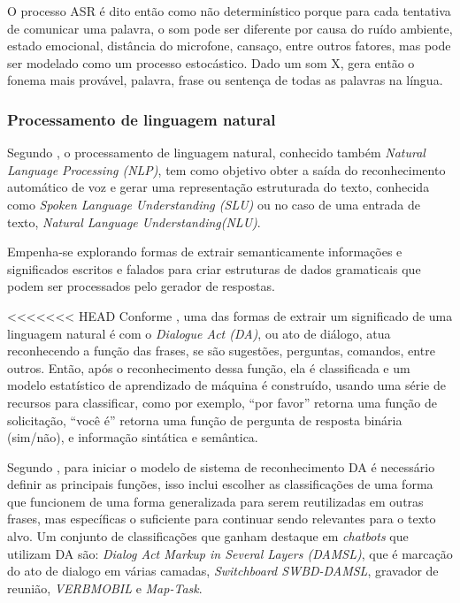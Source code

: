\documentclass[
	12pt,				%
	oneside,
	a4paper,			%
	english,			%
	french,				%
	spanish,			%
	brazil				%
	]{abntex2}
\begin{document}
O processo ASR é dito então como não determinístico porque para cada tentativa de comunicar uma palavra, o som pode ser diferente por causa do ruído ambiente, estado emocional, distância do microfone, cansaço, entre outros fatores, mas pode ser modelado como um processo estocástico. Dado um som X, gera então o fonema mais provável, palavra, frase ou sentença de todas as palavras na língua.

\subsubsection{Processamento de linguagem natural}
Segundo \textcite{spoken-language-understan.}, o processamento de linguagem natural, conhecido também \emph{Natural Language Processing (NLP)}, tem como objetivo obter a saída do reconhecimento automático de voz e gerar uma representação estruturada do texto, conhecida como \emph{Spoken Language Understanding (SLU)} ou no caso de uma entrada de texto, \emph{Natural Language Understanding(NLU)}.

Empenha-se explorando formas de extrair semanticamente informações e significados escritos e falados para criar estruturas de dados gramaticais que podem ser processados pelo gerador de respostas.

<<<<<<< HEAD
Conforme \textcite{conversational-interface}, uma das formas de extrair um significado de uma linguagem natural é com o \emph{Dialogue Act (DA)}, ou ato de diálogo, atua reconhecendo a função das frases, se são sugestões, perguntas, comandos, entre outros. Então, após o reconhecimento dessa função, ela é classificada e um modelo estatístico de aprendizado de máquina é construído, usando uma série de recursos para classificar, como por exemplo, “por favor” retorna uma função de solicitação, “você é” retorna uma função de pergunta de resposta binária (sim/não), e informação sintática e semântica.

Segundo \textcite{da-recognition}, para iniciar o modelo de sistema de reconhecimento DA é necessário definir as principais funções, isso inclui escolher as classificações de uma forma que funcionem de uma forma generalizada para serem reutilizadas em outras frases, mas específicas o suficiente para continuar sendo relevantes para o texto alvo. Um conjunto de classificações que ganham destaque em \emph{chatbots} que utilizam DA são: \emph{Dialog Act Markup in Several Layers (DAMSL)}, que é  marcação do ato de dialogo em várias camadas, \emph{Switchboard SWBD-DAMSL}, gravador de reunião, \emph{VERBMOBIL} e \emph{Map-Task}.
\end{document}
